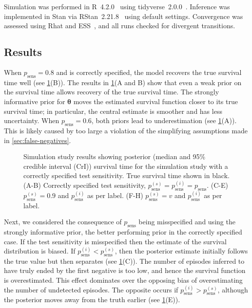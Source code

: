 \documentclass[referee,useAMS,usenatbib]{biom}
\renewcommand{\vec}[1]{\bm{#1}}
\newcommand{\psens}{p_\text{sens}}
\newcommand{\psenss}{p_\text{sens}^{(s)}}
\newcommand{\psensi}{p_\text{sens}^{(i)}}
\begin{document}
Simulation was performed in R~4.2.0~\citep{R-4-2-0} using tidyverse~2.0.0~\citep{tidyverse}.
Inference was implemented in Stan via RStan~2.21.8~\citep{rstan2-21-8} using default settings.
Convergence was assessed using Rhat and ESS~\citep{vehtariRhat}, and all runs checked for divergent transitions.

\subsection{Results}

When $\psens = 0.8$ and is correctly specified, the model recovers the true survival time well (see \cref{imperf-test:fig:simulation-results}(B)).
The results in \cref{imperf-test:fig:simulation-results}(A and B) show that even a weak prior on the survival time allows recovery of the true survival time.
The strongly informative prior for $\vec\theta$ moves the estimated survival function closer to its true survival time; in particular, the central estimate is smoother and has less uncertainty.
When $\psens = 0.6$, both priors lead to underestimation (see \cref{imperf-test:fig:simulation-results}(A)).
This is likely caused by too large a violation of the simplifying assumptions made in \cref{sec:false-negatives}.
\begin{figure}
  
  \caption[Simulation study results]{%
    Simulation study results showing posterior (median and 95\% credible interval (CrI)) survival time for the simulation study with a correctly specified test sensitivity.
    True survival time shown in black.
    (A-B) Correctly specified test sensitivity, $\psenss = \psensi = \psens$.
    (C-E) $\psenss = 0.9$ and $\psensi$ as per label.
    (F-H) $\psenss = v$ and $\psensi$ as per label.
  }
  \label{imperf-test:fig:simulation-results}
\end{figure}

Next, we considered the consequence of $\psens$ being misspecified and using the strongly informative prior, the better performing prior in the correctly specified case.
If the test sensitivity is misspecified then the estimate of the survival distribution is biased.
If $\psensi < \psenss$, then the posterior estimate initially follows the true value but then separates (see \cref{imperf-test:fig:simulation-results}(C)).
The number of episodes inferred to have truly ended by the first negative is too low, and hence the survival function is overestimated.
This effect dominates over the opposing bias of overestimating the number of undetected episodes.
The opposite occurs if $\psensi > \psenss$, although the posterior moves away from the truth earlier (see \cref{imperf-test:fig:simulation-results}(E)).
\end{document}
